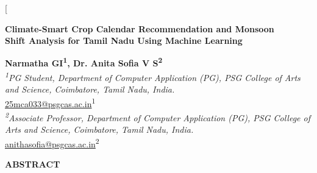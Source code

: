 \documentclass[12pt,a4paper,twocolumn]{article}
\begin{document}
\twocolumn[
\begin{center}
{\LARGE\bfseries Climate-Smart Crop Calendar Recommendation and Monsoon\\
Shift Analysis for Tamil Nadu Using Machine Learning}
\end{center}

\vspace{6pt}

\begin{center}
{\bfseries Narmatha GI\textsuperscript{1}, Dr. Anita Sofia V S\textsuperscript{2}}\\
\vspace{4pt}
{\itshape \textsuperscript{1}PG Student, Department of Computer Application (PG), PSG College of Arts and Science, Coimbatore, Tamil Nadu, India.}\\
\url{25mca033@psgcas.ac.in}\textsuperscript{1}\\
\vspace{2pt}
{\itshape \textsuperscript{2}Associate Professor, Department of Computer Application (PG), PSG College of Arts and Science, Coimbatore, Tamil Nadu, India.}\\
\url{anithasofia@psgcas.ac.in}\textsuperscript{2}
\end{center}

\vspace{10pt}

\noindent\textbf{ABSTRACT}
\end{document}
